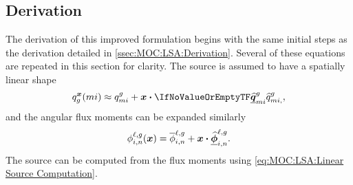 {{    \subsection{Derivation}{\label{ssec:LSMOC:Derivation}
      The derivation of this improved formulation begins with the same initial steps as the derivation detailed in \cref{ssec:MOC:LSA:Derivation}.
      Several of these equations are repeated in this section for clarity.
      The source is assumed to have a spatially linear shape
      \begin{equation}\label{eq:LSMOC:Source Shape}
        \source[mi][g][\loc] \approx \srcF[mi] + \loc\vdot\srcL[][mi],
      \end{equation}
      and the angular flux moments can be expanded similarly
      \begin{equation}\label{eq:LSMOC:Flux Expansion}
        \fluxA(\loc) = \fluxF + \loc\vdot\fluxL.
      \end{equation}
      The source can be computed from the flux moments using \cref{eq:MOC:LSA:Linear Source Computation}.

}}}

